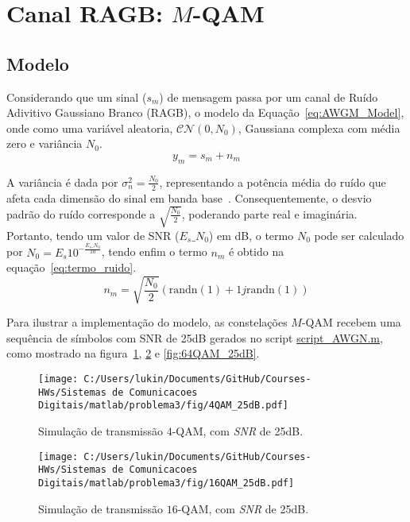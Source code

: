 \section{Canal RAGB: \texorpdfstring{$M$}{M}-QAM}
\subsection{Modelo}
Considerando que um sinal ($s_m$) de mensagem passa por um canal de Ruído Adivitivo Gaussiano Branco (RAGB), o modelo da Equação~\ref{eq:AWGM_Model}, onde como uma variável aleatoria, $\mathcal{C} \mathcal{N} (0,N_0)$, Gaussiana complexa com média zero e variância $N_0$. 
\begin{equation}
    y_m = s_m + n_m
    \label{eq:AWGM_Model}
\end{equation}

A variância é dada por $\sigma_{n}^{2} = \frac{N_0}{2}$, representando a potência média do ruído que afeta cada dimensão do sinal em banda base~\cite{Proakis}. Consequentemente, o desvio padrão do ruído corresponde a $\sqrt{\frac{N_0}{2}}$, poderando parte real e imaginária. Portanto, tendo um valor de SNR ($E_s\_N_0$) em dB, o termo $N_0$ pode ser calculado por $N_0= E_s 10^{-\frac{E_s\_N_0}{10}}$, tendo enfim o termo $n_m$ é obtido na equação~\ref{eq:termo_ruido}.
\begin{equation}
    n_m = \sqrt{\frac{N_0}{2}} \left(\text{randn}(1) + 1j \text{randn}(1)\right)
    \label{eq:termo_ruido}
\end{equation}

Para ilustrar a implementação do modelo, as constelações $M$-QAM recebem uma sequência de símbolos com SNR de 25dB gerados no script \href{https://raw.githubusercontent.com/lucasabdalah/Courses-HWs/SCD/Sistemas%20de%20Comunicacoes%20Digitais/matlab/problema3/script_AWGN.m}{\colorbox{gray!20}{\color{red}script\_AWGN.m}}, como mostrado na figura~\ref{fig:4QAM_25dB}, \ref{fig:16QAM_25dB} e \ref{fig:64QAM_25dB}.

\begin{figure}[!ht]
    \centering
    \texttt{[image: C:/Users/lukin/Documents/GitHub/Courses-HWs/Sistemas de Comunicacoes Digitais/matlab/problema3/fig/4QAM\_25dB.pdf]}
    \caption{Simulação de transmissão $4$-QAM, com \textit{SNR} de 25dB.}
    \label{fig:4QAM_25dB}
\end{figure}

\begin{figure}[!ht]
    \centering
    \texttt{[image: C:/Users/lukin/Documents/GitHub/Courses-HWs/Sistemas de Comunicacoes Digitais/matlab/problema3/fig/16QAM\_25dB.pdf]}
    \caption{Simulação de transmissão $16$-QAM, com \textit{SNR} de 25dB.}
    \label{fig:16QAM_25dB}
\end{figure}

